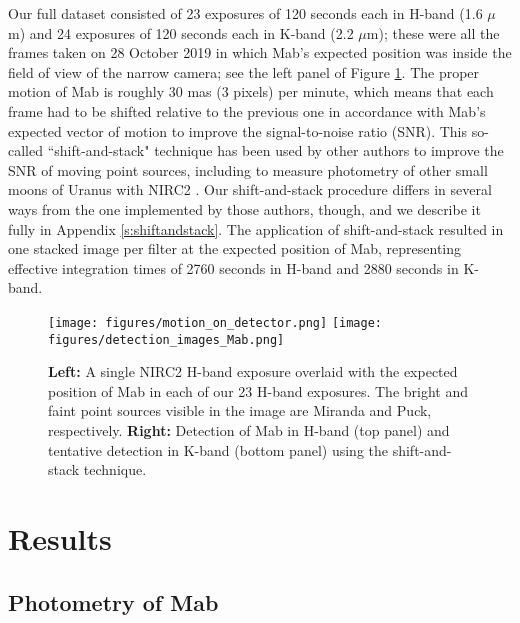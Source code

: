 \documentclass[preprint]{aastex631}
\begin{document}
Our full dataset consisted of 23 exposures of 120 seconds each in H-band (1.6 $\mu$m) and 24 exposures of 120 seconds each in K-band (2.2 $\mu$m); these were all the frames taken on 28 October 2019 in which Mab's expected position was inside the field of view of the narrow camera; see the left panel of Figure \ref{fig:detection}.
The proper motion of Mab is roughly 30 mas (3 pixels) per minute, which means that each frame had to be shifted relative to the previous one in accordance with Mab's expected vector of motion to improve the signal-to-noise ratio (SNR). This so-called ``shift-and-stack" technique has been used by other authors to improve the SNR of moving point sources, including to measure photometry of other small moons of Uranus with NIRC2 \citep[][]{paradis19, paradis23}. Our shift-and-stack procedure differs in several ways from the one implemented by those authors, though, and we describe it fully in Appendix \ref{s:shiftandstack}. The application of shift-and-stack resulted in one stacked image per filter at the expected position of Mab, representing effective integration times of 2760 seconds in H-band and 2880 seconds in K-band.

\begin{figure}
\texttt{[image: figures/motion\_on\_detector.png]}
\texttt{[image: figures/detection\_images\_Mab.png]}
\caption{\textbf{Left:} A single NIRC2 H-band exposure overlaid with the expected position of Mab in each of our 23 H-band exposures. The bright and faint point sources visible in the image are Miranda and Puck, respectively. \textbf{Right:} Detection of Mab in H-band (top panel) and tentative detection in K-band (bottom panel) using the shift-and-stack technique.\label{fig:detection}}
\end{figure}

\section{Results}
\label{s:results}

\subsection{Photometry of Mab}
\end{document}
